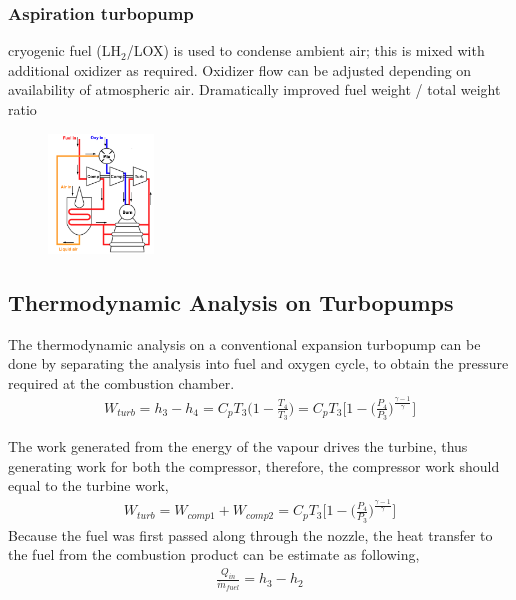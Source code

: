 \documentclass[a4paper,10pt]{article}
\begin{document}
\begin{multicols}{4}
\subsubsection*{Aspiration turbopump}
cryogenic fuel (LH$_2$/LOX) is used to condense ambient air; this is mixed with additional oxidizer as required. Oxidizer flow can be adjusted depending on availability of atmospheric air. Dramatically improved fuel weight / total weight ratio 
\begin{figure}[H]
    \centering
    \includegraphics[width=0.25\textwidth]{Figure/aspiration.png}
\end{figure}
\end{multicols}

\subsection{Thermodynamic Analysis on Turbopumps}
The thermodynamic analysis on a conventional expansion turbopump can be done by separating the analysis into fuel and oxygen cycle, to obtain the pressure required at the combustion chamber. 
\begin{gather*}
    W_{turb} = h_3-h_4 = C_pT_3\Bigg(1-\frac{T_4}{T_3}\Bigg) = C_pT_3\Bigg[1-\Bigg(\frac{P_4}{P_3}\Bigg)^{\frac{\gamma-1}{\gamma}}\Bigg]
\end{gather*}

The work generated from the energy of the vapour drives the turbine, thus generating work for both the compressor, therefore, the compressor work should equal to the turbine work,
\begin{gather*}
    W_{turb} = W_{comp1}+W_{comp2} = C_pT_3\Bigg[1-\Bigg(\frac{P_4}{P_3}\Bigg)^{\frac{\gamma-1}{\gamma}}\Bigg]
\end{gather*}
Because the fuel was first passed along through the nozzle, the heat transfer to the fuel from the combustion product can be estimate as following, 
\begin{gather*}
    \frac{Q_{in}}{\dot{m}_{fuel}} = h_3-h_2
\end{gather*}
\end{document}
